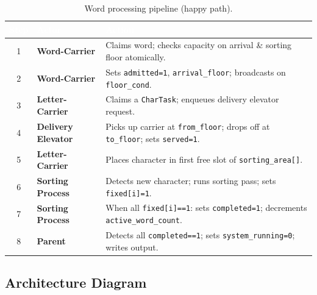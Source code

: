 \documentclass[12pt,a4paper]{article}
\newcommand{\code}[1]{\texttt{\small #1}}
\begin{document}
\begin{table}[htbp]
\centering
\caption{Word processing pipeline (happy path).}
\begin{tabularx}{\textwidth}{c >{\bfseries}l X}
\toprule
\rowcolor{darkblue}
\textcolor{white}{Step} &
\textcolor{white}{Actor} &
\textcolor{white}{Action} \\
\midrule
1 & Word-Carrier & Claims word; checks capacity on arrival \& sorting floor atomically. \\
\rowcolor{rowgray}
2 & Word-Carrier & Sets \code{admitted=1}, \code{arrival\_floor}; broadcasts on \code{floor\_cond}. \\
3 & Letter-Carrier & Claims a \code{CharTask}; enqueues delivery elevator request. \\
\rowcolor{rowgray}
4 & Delivery Elevator & Picks up carrier at \code{from\_floor}; drops off at \code{to\_floor}; sets \code{served=1}. \\
5 & Letter-Carrier & Places character in first free slot of \code{sorting\_area[]}. \\
\rowcolor{rowgray}
6 & Sorting Process & Detects new character; runs sorting pass; sets \code{fixed[i]=1}. \\
7 & Sorting Process & When all \code{fixed[i]==1}: sets \code{completed=1}; decrements \code{active\_word\_count}. \\
\rowcolor{rowgray}
8 & Parent & Detects all \code{completed==1}; sets \code{system\_running=0}; writes output. \\
\bottomrule
\end{tabularx}
\end{table}

\subsection{Architecture Diagram}
\end{document}
